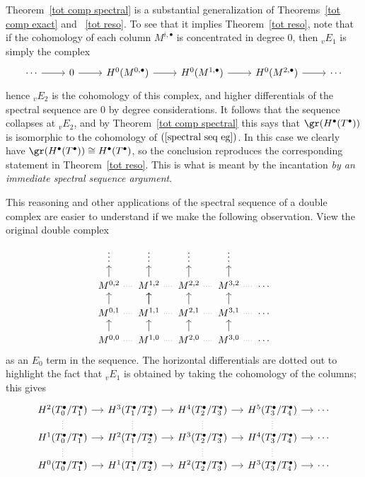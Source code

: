 Theorem~\ref{tot comp spectral} is a substantial generalization of Theorems~\ref{tot comp exact} and ~\ref{tot reso}. To see that it implies Theorem~\ref{tot reso}, 
note that if the cohomology of each column $M^{i,\bullet}$ is concentrated in degree $0$, then $_{v}E_1$ is simply the complex
\begin{equation}\label{spectral seq eg}
\begin{tikzcd}
\cdots\ar[r]&0\ar[r]&H^0(M^{0,\bullet})\ar[r]&H^0(M^{1,\bullet})\ar[r]&H^0(M^{2,\bullet})\ar[r]&\cdots
\end{tikzcd}
\end{equation}
hence $_{v}E_2$ is the cohomology of this complex, and higher differentials of the spectral sequence are $0$ by degree considerations. It follows that the sequence collapses at $_{v}E_2$, and by Theorem~\ref{tot comp spectral} this says that $\gr(H^\bullet(T^\bullet))$ is isomorphic to the cohomology of $(\ref{spectral seq eg})$. In this case we clearly have $\gr(H^\bullet(T^\bullet))\cong H^\bullet(T^\bullet)$, so the conclusion reproduces the corresponding statement in Theorem~\ref{tot reso}. This is what is meant by the incantation \textit{by an immediate spectral sequence argument}.\par
This reasoning and other applications of the spectral sequence of a double complex are easier to understand if we make the following observation. View the original double complex
\[\begin{tikzcd}[column sep=1.0 em,row sep=1.2 em]
\vdots&\vdots&\vdots&\vdots&{}\\
M^{0,2}\ar[u]\ar[r,no head,dotted]&M^{1,2}\ar[u]\ar[r,no head,dotted]&M^{2,2}\ar[u]\ar[r,no head,dotted]&M^{3,2}\ar[r,no head,dotted]\ar[u]&\cdots\\
M^{0,1}\ar[r,no head,dotted]\ar[u]&M^{1,1}\ar[u]\ar[r,no head,dotted]\ar[u]&M^{2,1}\ar[u]\ar[r,no head,dotted]&M^{3,1}\ar[u]\ar[r,no head,dotted]&\cdots\\
M^{0,0}\ar[u]\ar[r,no head,dotted]&M^{1,0}\ar[u]\ar[r,no head,dotted]&M^{2,0}\ar[u]\ar[r,no head,dotted]&M^{3,0}\ar[r,no head,dotted]\ar[u]&\cdots
\end{tikzcd}\]
as an $E_0$ term in the sequence. The horizontal differentials are dotted out to highlight the fact that $_{v}E_1$ is obtained by taking the cohomology of the columns; this gives
\[\begin{tikzcd}[column sep=1.2 em,row sep=1.0 em]
H^2(T^\bullet_0/T^\bullet_1)\ar[r]&H^3(T^\bullet_1/T^\bullet_2)\ar[r]&H^4(T^\bullet_2/T^\bullet_3)\ar[r]&H^5(T^\bullet_3/T^\bullet_4)\ar[r]&\cdots\\
H^1(T^\bullet_0/T^\bullet_1)\ar[r]\ar[u,no head,dotted]&H^2(T^\bullet_1/T^\bullet_2)\ar[r]\ar[u,no head,dotted]&H^3(T^\bullet_2/T^\bullet_3)\ar[r]\ar[u,no head,dotted]&H^4(T^\bullet_3/T^\bullet_4)\ar[r]\ar[u,no head,dotted]&\cdots\\
H^0(T^\bullet_0/T^\bullet_1)\ar[r]\ar[u,no head,dotted]&H^1(T^\bullet_1/T^\bullet_2)\ar[r]\ar[u,no head,dotted]&H^2(T^\bullet_2/T^\bullet_3)\ar[r]\ar[u,no head,dotted]&H^3(T^\bullet_3/T^\bullet_4)\ar[r]\ar[u,no head,dotted]&\cdots
\end{tikzcd}\]
